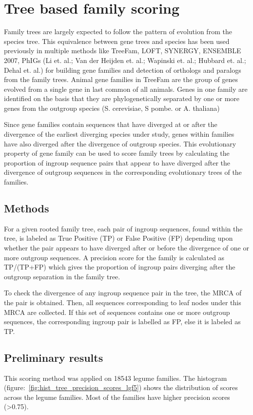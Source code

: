 \documentclass{article}
\begin{document}
			\pagebreak
	\section{Tree based family scoring}
	Family trees are largely expected to follow the pattern of evolution from the species tree. This equivalence between gene trees and species has been used previously in multiple methods like TreeFam, LOFT, SYNERGY, ENSEMBLE 2007, PhIGs (Li et. al.; Van der Heijden et. al.; Wapinski et. al.; Hubbard et. al.; Dehal et. al.) for building gene families and detection of orthologs and paralogs from the family trees. Animal gene families in TreeFam are the group of genes evolved from a single gene in last common of all animals. Genes in one family are identified on the basis that they are phylogenetically separated by one or more genes from the outgroup species (S. cerevisiae, S pombe. or A. thaliana)
	
	Since gene families contain sequences that have diverged at or after the divergence of the earliest diverging species under study, genes within families have also diverged after the divergence of outgroup species. This evolutionary property of gene family can be used to score family trees by calculating the proportion of ingroup sequence pairs that appear to have diverged after the divergence of outgroup sequences in the corresponding evolutionary trees of the families.
		\subsection{Methods}
		For a given rooted family tree, each pair of ingroup sequences, found within the tree, is labeled as True Positive (TP) or False Positive (FP) depending upon whether the pair appears to have diverged after or before the divergence of one or more outgroup sequences. A precision score for the family is calculated  as TP/(TP+FP) which gives the proportion of ingroup pairs diverging after the outgroup separation in the family tree.
		
		To check the divergence of any ingroup sequence pair in the tree, the MRCA of the pair is obtained. Then, all sequences corresponding to leaf nodes under this MRCA are collected. If this set of sequences contains one or more outgroup sequences, the corresponding ingroup pair is labelled as FP, else it is labeled as TP.
		
		\subsection{Preliminary results}
		This scoring method was applied on 18543 legume families. The histogram (figure:~\ref{fig:hist_tree_precision_scores_lgf5}) shows the distribution of scores across the legume families. Most of the families have higher precision scores (>0.75).
		
\end{document}
